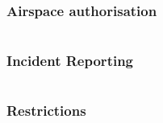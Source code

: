 \documentclass[usenames,dvipsnames,aspectratio=169,serif]{beamer}
\begin{document}
\begin{frame}
   \frametitle{Airspace authorisation}
   \begin{columns}[t]
      \begin{column}{0.5\textwidth}
      \end{column}
      \begin{column}{0.5\textwidth}
      \end{column}
   \end{columns}
\end{frame}

\begin{frame}
   \frametitle{Incident Reporting}
   \begin{columns}[t]
      \begin{column}{0.5\textwidth}
      \end{column}
      \begin{column}{0.5\textwidth}
      \end{column}
   \end{columns}
\end{frame}


\begin{frame}
   \frametitle{Restrictions}
   \begin{columns}[t]
      \begin{column}{0.5\textwidth}
      \end{column}
      \begin{column}{0.5\textwidth}
      \end{column}
   \end{columns}
\end{frame}
\end{document}
